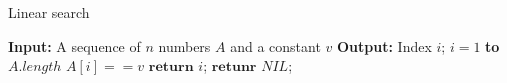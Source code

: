 \documentclass[review, authoryear, 3p, 12pt]{elsarticle}
\begin{document}
	\begin{algorithm}[htbp]
		\caption{Linear search}
		\label{alg:tsh}
		\begin{codebox}
			\zi		\textbf{Input:} A sequence of $n$ numbers $A$ and a constant $v$
			\zi 	\textbf{Output:} Index $i$;
			\li 	\For $i=1$ \textbf{to} $A.length$
					\Do
			\li 		\If $A[i] == v$ 
						\Then
			\li				$\textbf{return } i$;
						\End
					\End
			\li		$\textbf{retunr } NIL$;
		\end{codebox}
	\end{algorithm}
\end{document}
